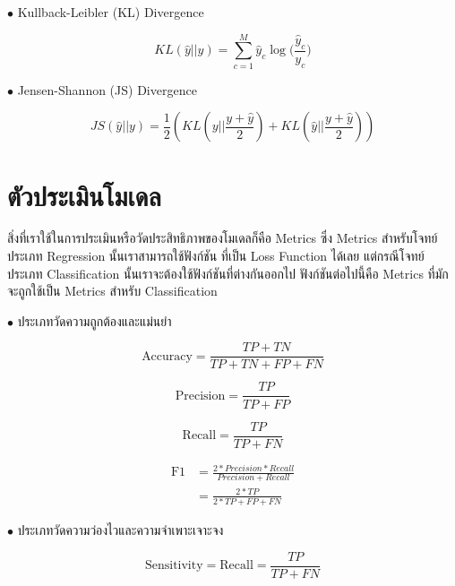 \noindent $\bullet$ Kullback-Leibler (KL) Divergence

\begin{equation}
    KL(\hat{y} || y) = \sum_{c=1}^{M}\hat{y}_c \log \bigg( {\frac{\hat{y}_c}{y_c}} \bigg)
\end{equation}

\noindent $\bullet$ Jensen-Shannon (JS) Divergence

\begin{equation}
    JS(\hat{y} || y) = \frac{1}{2}(KL(y||\frac{y+\hat{y}}{2}) + KL(\hat{y}||\frac{y+\hat{y}}{2}))
\end{equation}

\section{ตัวประเมินโมเดล}
\label{sec:metrics}

สิ่งที่เราใช้ในการประเมินหรือวัดประสิทธิภาพของโมเดลก็คือ Metrics ซึ่ง Metrics สำหรับโจทย์ประเภท Regression นั้นเราสามารถใช้ฟังก์ชัน%
ที่เป็น Loss Function ได้เลย แต่กรณีโจทย์ประเภท Classification นั้นเราจะต้องใช้ฟังก์ชันที่ต่างกันออกไป ฟังก์ชันต่อไปนี้คือ Metrics 
ที่มักจะถูกใช้เป็น Metrics สำหรับ Classification

\noindent $\bullet$ ประเภทวัดความถูกต้องและแม่นยำ

\begin{equation}
    \text{Accuracy} = \frac{TP+TN}{TP+TN+FP+FN}
\end{equation}

\begin{equation}
    \text{Precision} = \frac{TP}{TP+FP}
\end{equation}

\begin{equation}
    \text{Recall} = \frac{TP}{TP+FN}
\end{equation}

\begin{align}
    \text{F1} &= \frac{2*Precision*Recall}{Precision+Recall} \nonumber \\
    &= \frac{2*TP}{2*TP+FP+FN}
\end{align}

\noindent $\bullet$ ประเภทวัดความว่องไวและความจำเพาะเจาะจง

\begin{equation}
    \text{Sensitivity} = \text{Recall} = \frac{TP}{TP+FN}
\end{equation}

